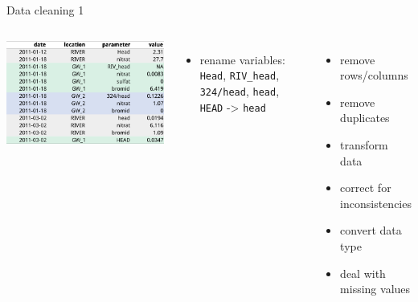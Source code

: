 \documentclass[8pt,ignorenonframetext,]{beamer}
\newenvironment{Shaded}{\begin{snugshade}}{\end{snugshade}}
\newcommand{\KeywordTok}[1]{\textcolor[rgb]{0.13,0.29,0.53}{\textbf{{#1}}}}
\newcommand{\StringTok}[1]{\textcolor[rgb]{0.31,0.60,0.02}{{#1}}}
\newcommand{\NormalTok}[1]{{#1}}
\providecommand{\tightlist}{%
  \setlength{\itemsep}{0pt}\setlength{\parskip}{0pt}}
\newcommand{\columnsbegin}{\begin{columns}}
\newcommand{\columnsend}{\end{columns}}
\begin{document}
\begin{frame}[fragile]{Data cleaning 1}

\columnsbegin


\includegraphics{imgPres/data_tidying_table_messy_bad.png}

\begin{itemize}
\item
  rename variables: \texttt{Head}, \texttt{RIV\_head},
  \texttt{324/head}, \texttt{head}, \texttt{HEAD} -\textgreater{}
  \texttt{head}

\begin{Shaded}
\end{Shaded}
\end{itemize}


\begin{itemize}
\tightlist
\item
  remove rows/columns
\item
  remove duplicates
\item
  transform data
\item
  correct for inconsistencies
\item
  convert data type
\item
  deal with missing values
\end{itemize}

\columnsend

\end{frame}
\end{document}
